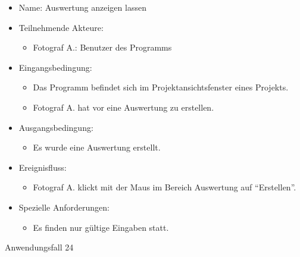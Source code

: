	\begin{itemize}
		\item Name: Auswertung anzeigen lassen
		\item Teilnehmende Akteure:
		\begin{itemize}
			\item	Fotograf A.: Benutzer des Programms		
		\end{itemize}
		\item Eingangsbedingung:
		\begin{itemize}
			\item	Das Programm befindet sich im Projektansichtsfenster eines Projekts.
			\item Fotograf A. hat vor eine Auswertung zu erstellen.
		\end{itemize}
		\item Ausgangsbedingung:
		\begin{itemize}
			\item	Es wurde eine Auswertung erstellt.	
		\end{itemize}
		\item Ereignisfluss:
		\begin{itemize}
			\item Fotograf A. klickt mit der Maus im Bereich Auswertung auf "`Erstellen"'.
		\end{itemize}
		\item Spezielle Anforderungen:
		\begin{itemize}
			\item	Es finden nur gültige Eingaben statt.			
		\end{itemize}			
	\end{itemize}
	
	\begin{description}
		\item[Anwendungsfall 24]
	\end{description}
	
